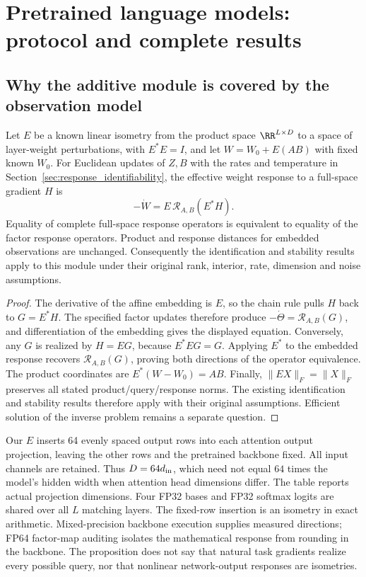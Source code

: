 \section{Pretrained language models: protocol and complete results}
\label{app:llm-study}

\subsection{Why the additive module is covered by the observation model}

\begin{proposition}
\label{prop:llm-embedding}
Let $E$ be a known linear isometry from the product space
$\RR^{L\times D}$ to a space of layer-weight perturbations, with
$E^*E=I$, and let $W=W_0+E(AB)$ with fixed known $W_0$.
For Euclidean updates of $Z,B$ with the rates and temperature in
Section~\ref{sec:response_identifiability}, the effective weight response
 to a full-space gradient $H$ is
\[
 -\dot W=E\,\mathcal R_{A,B}(E^*H).
\]
Equality of complete full-space response operators is equivalent to
 equality of the factor response operators. Product and response distances
 for embedded observations are unchanged. Consequently the identification
 and stability results apply to this module under their original rank,
 interior, rate, dimension and noise assumptions.
\end{proposition}
\begin{proof}
The derivative of the affine embedding is $E$, so the chain rule pulls
$H$ back to $G=E^*H$. The specified factor updates therefore produce
$-\dot\Theta=\mathcal R_{A,B}(G)$, and differentiation of the embedding
 gives the displayed equation. Conversely, any $G$ is realized by $H=EG$,
 because $E^*EG=G$. Applying $E^*$ to the embedded response recovers
$\mathcal R_{A,B}(G)$, proving both directions of the operator equivalence.
The product coordinates are $E^*(W-W_0)=AB$. Finally,
$\|EX\|_F=\|X\|_F$ preserves all stated product/query/response norms.
The existing identification and stability results therefore apply with
 their original assumptions. Efficient solution of the inverse problem
 remains a separate question.
\end{proof}

Our $E$ inserts 64 evenly spaced output rows into each attention output
projection, leaving the other rows and the pretrained backbone fixed.
All input channels are retained. Thus $D=64d_{\rm in}$, which need not
 equal $64$ times the model's hidden width when attention head dimensions
 differ. The table reports actual projection dimensions. Four FP32 bases
 and FP32 softmax logits are shared over all $L$ matching layers. The
 fixed-row insertion is an isometry in exact arithmetic. Mixed-precision
 backbone execution supplies measured directions; FP64 factor-map auditing
 isolates the mathematical response from rounding in the backbone.
The proposition does not say that natural task gradients realize every
 possible query, nor that nonlinear network-output responses are isometries.


